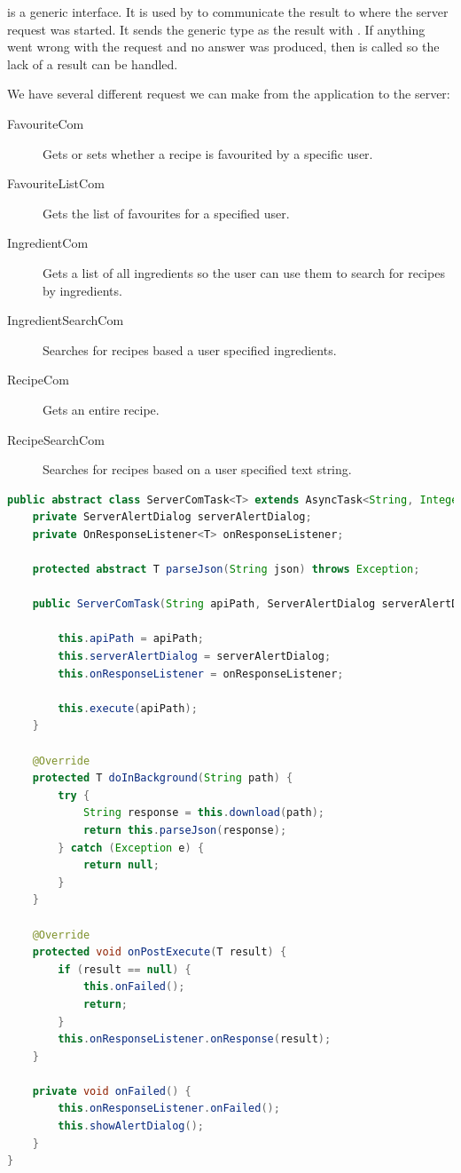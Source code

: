  is a generic interface. It is used by  to communicate the result to where the server request was started. It sends the generic type as the result with . If anything went wrong with the request and no answer was produced, then  is called so the lack of a result can be handled.

We have several different request we can make from the application to the server:
\begin{description}
\item[FavouriteCom] Gets or sets whether a recipe is favourited by a specific user.
\item[FavouriteListCom] Gets the list of favourites for a specified user.
\item[IngredientCom] Gets a list of all ingredients so the user can use them to search for recipes by ingredients.
\item[IngredientSearchCom] Searches for recipes based a user specified ingredients.
\item[RecipeCom] Gets an entire recipe.
\item[RecipeSearchCom] Searches for recipes based on a user specified text string.
\end{description}

\begin{lstlisting}[language=java, label=lst:servercomtask, caption={Simplified code of the \inline{ServerComTask}.}]
public abstract class ServerComTask<T> extends AsyncTask<String, Integer, T> {
    private ServerAlertDialog serverAlertDialog;
    private OnResponseListener<T> onResponseListener;

    protected abstract T parseJson(String json) throws Exception;
    
    public ServerComTask(String apiPath, ServerAlertDialog serverAlertDialog, OnResponseListener<T> onResponseListener) {
    
        this.apiPath = apiPath;
        this.serverAlertDialog = serverAlertDialog;
        this.onResponseListener = onResponseListener;

        this.execute(apiPath);
    }

    @Override
    protected T doInBackground(String path) {
        try {
            String response = this.download(path);
            return this.parseJson(response);
        } catch (Exception e) {
            return null;
        }
    }

    @Override
    protected void onPostExecute(T result) {
        if (result == null) {
            this.onFailed();
            return;
        }
        this.onResponseListener.onResponse(result);
    }
    
    private void onFailed() {
        this.onResponseListener.onFailed();
        this.showAlertDialog();
    }
}
\end{lstlisting}

